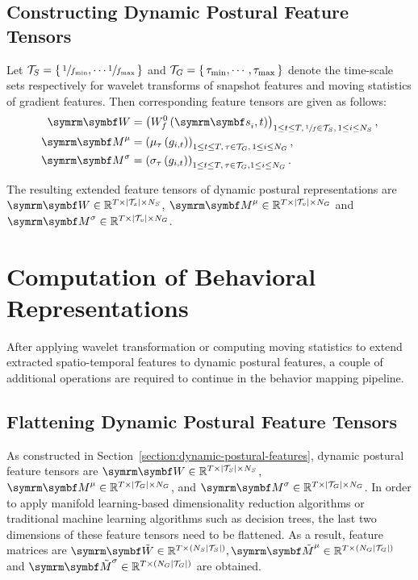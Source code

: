 \subsection{Constructing Dynamic Postural Feature Tensors}
Let $\mathcal{T}_S=\left\{ \, \sfrac{1}{f_{\textnormal{min}}}, \cdots \sfrac{1}{f_{\textnormal{max}}} \, \right\}$ and $\mathcal{T}_G=\left\{ \, \tau_{\textnormal{min}}, \cdots, \tau_{\textnormal{max}} \, \right\}$ denote the time-scale sets respectively for wavelet transforms of snapshot features and moving statistics of gradient features. Then corresponding feature tensors are given as follows:
\begin{equation}
	\begin{aligned}
		\V{W}        & = \rbr{W^0_{f}\rbr{\V{s}_i, t}}_{1 \leq t \leq T, \, \sfrac{1}{f} \in \mathcal{T}_S, \, 1 \leq i \leq N_S}, \\
		\V{M}^\mu    & = \rbr{\mu_\tau\rbr{g_{i,t}}}_{1\leq t \leq T, \, \tau \in \mathcal{T}_G, \, 1 \leq i \leq  N_G},           \\
		\V{M}^\sigma & = \rbr{\sigma_\tau\rbr{g_{i,t}}}_{1\leq t \leq T, \, \tau \in \mathcal{T}_G, 1 \leq i \leq N_G}.
	\end{aligned}
\end{equation}

The resulting extended feature tensors of dynamic postural representations are $\V{W} \in \mathbb{R}^{T \times \card*{\mathcal{T}_s} \times N_S}$, $\V{M}^\mu \in \mathbb{R}^{T \times \card*{\mathcal{T}_v} \times N_G}$ and $\V{M}^\sigma \in \mathbb{R}^{T \times \card*{\mathcal{T}_v} \times N_G}$.

\section{Computation of Behavioral Representations}
After applying wavelet transformation or computing moving statistics to extend extracted spatio-temporal features to dynamic postural features, a couple of additional operations are required to continue in the behavior mapping pipeline.

\subsection{Flattening Dynamic Postural Feature Tensors}
As constructed in Section~\ref{section:dynamic-postural-features}, dynamic postural feature tensors are $\V{W} \in \mathbb{R}^{T \times \card*{\mathcal{T}_S} \times N_S}$, $\V{M}^\mu \in \mathbb{R}^{T \times \card*{\mathcal{T}_G} \times N_G}$, and  $\V{M}^\sigma \in \mathbb{R}^{T \times \card*{\mathcal{T}_G} \times N_G}$.
In order to apply manifold learning-based dimensionality reduction algorithms or traditional machine learning algorithms such as decision trees, the last two dimensions of these feature tensors need to be flattened.
As a result, feature matrices are $\V{\tilde{W}} \in \mathbb{R}^{T \times \rbr{ N_S\card*{\mathcal{T}_S}}}, {\V{\tilde{M}}^\mu} \in \mathbb{R}^{T \times \rbr{ N_G\card*{\mathcal{T}_G}}}$ and ${\V{\tilde{M}}^\sigma} \in \mathbb{R}^{T \times \rbr{ N_G\card*{\mathcal{T}_G}}}$ are obtained.

